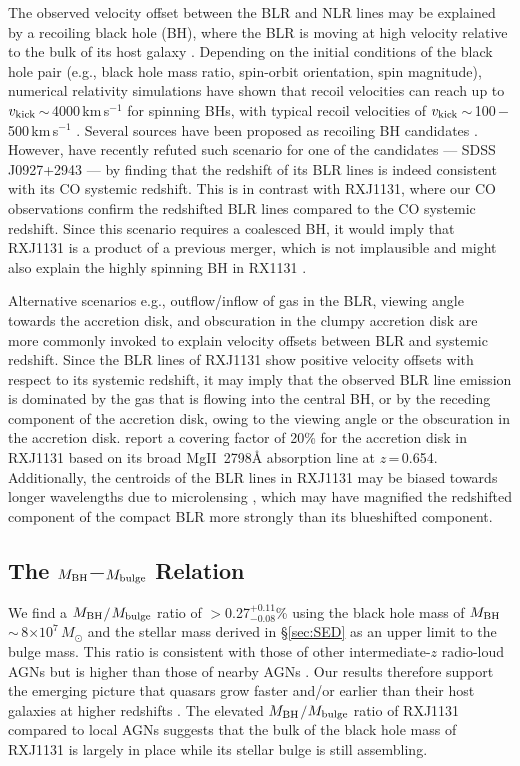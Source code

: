 \documentclass[]{emulateapj}
\newcommand{\mbulge}{\mbox{$M_{\rm bulge}$}\xspace}
\newcommand{\Msun}{\mbox{$M_{\odot}$}\xspace}
\newcommand{\mgii}{\mbox{Mg{\scriptsize II}~2798\AA}\xspace}
\newcommand{\kms}{\mbox{km\,s$^{-1}$}\xspace}
\newcommand{\E}[1]{\mbox{$\times10^{#1}$}}
\newcommand{\petm}[2]{$^{+#1}_{-#2}$}
\newcommand{\eq}{\,=\,}
\newcommand{\ssim}{\,$\sim$\,}
\newcommand{\eg}{{e.g.,~}}
\newcommand{\Sec}[1]{\S\ref{sec:#1}}
\begin{document}
The observed velocity offset between the BLR and NLR lines may be explained by
a recoiling black hole (BH),
where the BLR is moving at high velocity relative to the bulk of its host galaxy
\citep{Madau04a, Bonning07a, Loeb07a}.
Depending on the initial conditions of the black hole pair (e.g., black hole mass ratio, spin-orbit orientation, spin magnitude),
numerical relativity simulations have shown that recoil velocities can reach up to
$v_{\rm kick}$\ssim4000\,\kms for spinning BHs,
with typical recoil velocities of $v_{\rm kick}$\ssim100\,$-$\,500\,\kms
\citep[\eg][]{Libeskind06a,Campanelli07a}.
Several sources have been proposed as recoiling BH candidates \citep[][]{Komossa08a, Civano10a, Steinhardt12a}.
However, \citet{Decarli14a} have recently refuted
such scenario for one of the candidates --- SDSS J0927+2943 --- by finding that the redshift of its
BLR lines is indeed consistent with its CO systemic redshift.
This is in contrast with RXJ1131, where our CO observations confirm
the redshifted BLR lines compared to the CO systemic redshift.
Since this scenario requires a coalesced BH, it would imply that RXJ1131
is a product of a previous merger, which is not implausible and
might also explain the highly spinning BH in RX1131 \citep[$a$\ssim0.9;][]{Reis14a}.

Alternative scenarios
e.g., outflow/inflow of gas in the BLR, viewing angle towards the accretion disk, and
obscuration in the clumpy accretion disk
are more commonly invoked to explain velocity offsets between BLR and systemic redshift.
Since the BLR lines of RXJ1131 show positive velocity offsets with respect to its systemic redshift, it may imply that
the observed
BLR line emission is dominated by the gas that is flowing into the central BH, or by the receding component of
the accretion disk, owing to the viewing angle or the obscuration in the accretion disk.
\citet{Sluse07a} report a covering factor of 20\% for the accretion disk in RXJ1131
based on its broad \mgii absorption line at $z$\eq0.654.
Additionally, the centroids of the BLR lines in RXJ1131 may be biased towards longer wavelengths due to
microlensing \citep[\eg][]{Sluse07a, Sluse12a}, which may have
magnified the redshifted component of the compact BLR more strongly than its blueshifted component.

\subsection{The $M_{\rm BH}$$-$\mbulge Relation}
We find a $M_{\rm BH}$$/$$M_{\rm bulge}$ ratio of $>$0.27\petm{0.11}{0.08}\%
using the black hole mass of $M_{\rm BH}$\ssim8\E{7}\,\Msun \citep{Sluse12a}
and the stellar mass derived in \Sec{SED} as an upper limit to the bulge mass.
This ratio is consistent with those of other intermediate-$z$ radio-loud AGNs \citep{McLure06a}
but is higher than those of nearby AGNs \citep{HR04a}.
Our results therefore support
the emerging picture that quasars
grow faster and/or earlier than their host galaxies at higher redshifts \citep[e.g., ][]{Walter04a, Peng06a, McLure06a,Riechers08a}.
The elevated $M_{\rm BH}$$/$$M_{\rm bulge}$ ratio of RXJ1131 compared to local AGNs
suggests that the bulk of the black hole mass of RXJ1131 is largely in place while its stellar bulge is still assembling.
\end{document}
